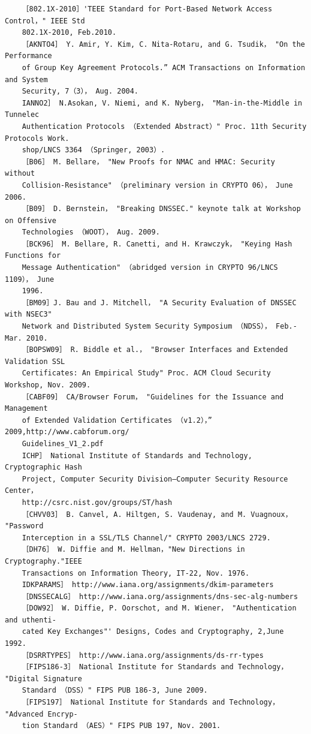 \begin{verbatim}
    ［802.1X-2010］'TEEE Standard for Port-Based Network Access Control，" IEEE Std
    802.1X-2010, Feb.2010.
    ［AKNTO4］ Y. Amir, Y. Kim, C. Nita-Rotaru, and G. Tsudik， "On the Performance
    of Group Key Agreement Protocols.” ACM Transactions on Information and System
    Security, 7（3）， Aug. 2004.
    IANNO2］ N.Asokan, V. Niemi, and K. Nyberg， "Man-in-the-Middle in Tunnelec
    Authentication Protocols （Extended Abstract）" Proc. 11th Security Protocols Work.
    shop/LNCS 3364 （Springer, 2003）.
    ［B06］ M. Bellare， "New Proofs for NMAC and HMAC: Security without
    Collision-Resistance" （preliminary version in CRYPTO 06）， June 2006.
    ［B09］ D. Bernstein， "Breaking DNSSEC." keynote talk at Workshop on Offensive
    Technologies （WOOT）， Aug. 2009.
    ［BCK96］ M. Bellare, R. Canetti, and H. Krawczyk， "Keying Hash Functions for
    Message Authentication" （abridged version in CRYPTO 96/LNCS 1109）， June
    1996.
    ［BM09］J. Bau and J. Mitchell， "A Security Evaluation of DNSSEC with NSEC3"
    Network and Distributed System Security Symposium （NDSS）， Feb.-Mar. 2010.
    ［BOPSW09］ R. Biddle et al.， "Browser Interfaces and Extended Validation SSL
    Certificates: An Empirical Study" Proc. ACM Cloud Security Workshop, Nov. 2009.
    ［CABF09］ CA/Browser Forum， "Guidelines for the Issuance and Management
    of Extended Validation Certificates （v1.2），” 2009,http://www.cabforum.org/
    Guidelines_V1_2.pdf
    ICHP］ National Institute of Standards and Technology, Cryptographic Hash
    Project, Computer Security Division—Computer Security Resource Center，
    http://csrc.nist.gov/groups/ST/hash
    ［CHVV03］ B. Canvel, A. Hiltgen, S. Vaudenay, and M. Vuagnoux， "Password
    Interception in a SSL/TLS Channel/" CRYPTO 2003/LNCS 2729.
    ［DH76］ W. Diffie and M. Hellman，"New Directions in Cryptography."IEEE
    Transactions on Information Theory, IT-22, Nov. 1976.
    IDKPARAMS］ http://www.iana.org/assignments/dkim-parameters
    ［DNSSECALG］ http://www.iana.org/assignments/dns-sec-alg-numbers
    ［DOW92］ W. Diffie, P. Oorschot, and M. Wiener， "Authentication and uthenti-
    cated Key Exchanges"' Designs, Codes and Cryptography, 2,June 1992.
    ［DSRRTYPES］ http://www.iana.org/assignments/ds-rr-types
    ［FIPS186-3］ National Institute for Standards and Technology， "Digital Signature
    Standard （DSS）" FIPS PUB 186-3, June 2009.
    ［FIPS197］ National Institute for Standards and Technology， "Advanced Encryp-
    tion Standard （AES）" FIPS PUB 197, Nov. 2001.

\end{verbatim}
